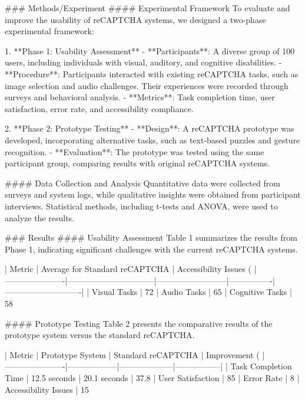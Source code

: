 ### Methods/Experiment  
#### Experimental Framework  
To evaluate and improve the usability of reCAPTCHA systems, we designed a two-phase experimental framework:  

1. **Phase 1: Usability Assessment**  
   - **Participants**: A diverse group of 100 users, including individuals with visual, auditory, and cognitive disabilities.  
   - **Procedure**: Participants interacted with existing reCAPTCHA tasks, such as image selection and audio challenges. Their experiences were recorded through surveys and behavioral analysis.  
   - **Metrics**: Task completion time, user satisfaction, error rate, and accessibility compliance.  

2. **Phase 2: Prototype Testing**  
   - **Design**: A reCAPTCHA prototype was developed, incorporating alternative tasks, such as text-based puzzles and gesture recognition.  
   - **Evaluation**: The prototype was tested using the same participant group, comparing results with original reCAPTCHA systems.  

#### Data Collection and Analysis  
Quantitative data were collected from surveys and system logs, while qualitative insights were obtained from participant interviews. Statistical methods, including t-tests and ANOVA, were used to analyze the results.  

### Results  
#### Usability Assessment  
Table 1 summarizes the results from Phase 1, indicating significant challenges with the current reCAPTCHA systems.  

| Metric               | Average for Standard reCAPTCHA | Accessibility Issues (%
|----------------------|--------------------------------|--------------------------|----------------|----------------------------|  
| Visual Tasks         | 72%
| Audio Tasks          | 65%
| Cognitive Tasks      | 58%

#### Prototype Testing  
Table 2 presents the comparative results of the prototype system versus the standard reCAPTCHA.  

| Metric               | Prototype System | Standard reCAPTCHA | Improvement (%
|----------------------|------------------|--------------------|-----------------|  
| Task Completion Time | 12.5 seconds    | 20.1 seconds       | 37.8%
| User Satisfaction    | 85%
| Error Rate           | 8%
| Accessibility Issues | 15%

